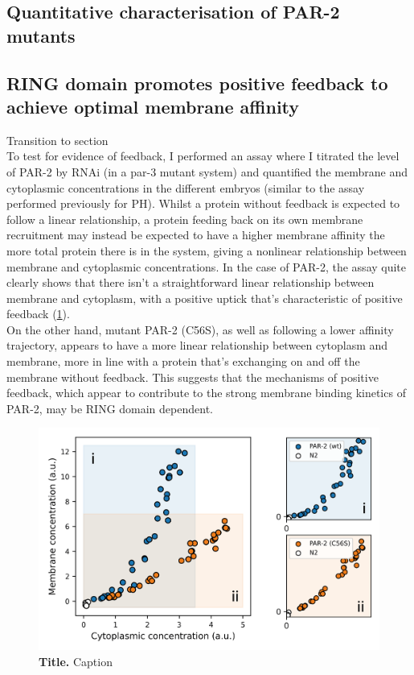 \documentclass[12pt]{"article"}
\newcommand{\mycaption}[2]{\caption[#1]{\textbf{#1.} #2}}
\begin{document}
\clearpage
\subsection{Quantitative characterisation of PAR-2 mutants}

\clearpage
\subsection{RING domain promotes positive feedback to achieve optimal membrane affinity}

Transition to section\\

To test for evidence of feedback, I performed an assay where I titrated the level of PAR-2 by RNAi (in a par-3 mutant system) and quantified the membrane and cytoplasmic concentrations in the different embryos (similar to the assay performed previously for PH). Whilst a protein without feedback is expected to follow a linear relationship, a protein feeding back on its own membrane recruitment may instead be expected to have a higher membrane affinity the more total protein there is in the system, giving a nonlinear relationship between membrane and cytoplasmic concentrations. In the case of PAR-2, the assay quite clearly shows that there isn't a straightforward linear relationship between membrane and cytoplasm, with a positive uptick that's characteristic of positive feedback (\cref{fig:rundown_vs_c56s}).\\

On the other hand, mutant PAR-2 (C56S), as well as following a lower affinity trajectory, appears to have a more linear relationship between cytoplasm and membrane, more in line with a protein that's exchanging on and off the membrane without feedback. This suggests that the mechanisms of positive feedback, which appear to contribute to the strong membrane binding kinetics of PAR-2, may be RING domain dependent.

\begin{figure}[!h]
\includegraphics[scale=1]{rundown_vs_c56s}
\setlength{\abovecaptionskip}{20pt}
\centering
\mycaption{Title}{Caption}
\label{fig:rundown_vs_c56s}
\end{figure}
\end{document}
